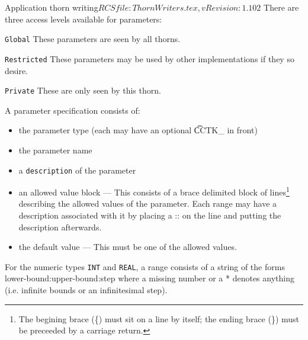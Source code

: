 \begin{cactuspart}{2}{Application thorn writing}{$RCSfile: ThornWriters.tex,v $}{$Revision: 1.102 $}
There are three access levels available for parameters:

\begin{Lentry}
\item [{\tt Global}]
These parameters are seen by all thorns.
\item [{\tt Restricted}]
These parameters may be used by other implementations if they so desire.
\item [{\tt Private}]
These are only seen by this thorn.
\end {Lentry}

A parameter specification consists of:
\begin{itemize}

\item the parameter type (each may have an optional {\t CCTK\_} in front)

\item the parameter name

\item a {\tt description} of the parameter

\item an allowed value block --- This consists of a brace delimited
block of lines\footnote{The begining brace (\{) must sit on a line by
itself; the ending brace (\}) must be preceeded by a carriage return.}
describing the allowed values of the parameter.  Each range may have a
description associated with it by placing a :: on the line and putting
the description afterwards.

\item the default value ---
This must be one of the allowed values.

\end{itemize}

For the numeric types {\tt INT} and {\tt REAL}, a range consists
of a string of the
forms lower-bound:upper-bound:step where a missing number or a * denotes
anything (i.e. infinite bounds or an infinitesimal step).


\end{cactuspart}
